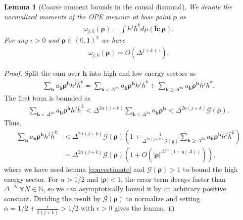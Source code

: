 \documentclass[a4paper,11pt]{article}
\theoremstyle{plain}
\newtheorem{lem}[thm]{Lemma}
\theoremstyle{definition}
\theoremstyle{remark}
\newcommand{\bs}[1]{\boldsymbol{#1}}
\newcommand{\bh}{{\bar{h}}}
\newcommand{\ba}{\begin{equation} \begin{aligned}}
\newcommand{\ea}{\end{aligned} \end{equation}}
\newcommand{\De}{\Delta}
\begin{document}
\begin{appendix}
\begin{lem}[Coarse moment bounds in the causal diamond]
We denote the normalized moments of the OPE measure at base point $\bs{\rho}$ as
\ba
\omega_{j,k}(\bs{\rho}) = \int h^j \bh^k d\mu(\bs{h};\bs{\rho}).
\ea
For any $\epsilon > 0$ and $\bs{\rho} \in (0,1)^2$ we have
\ba
\omega_{j,k}(\bs{\rho}) = O(\De^{j+k + \epsilon}).
\ea
\end{lem}
\begin{proof}
    Split the sum over $\bs{h}$ into high and low energy sectors as
    \ba
\sum_{\bs{h}} a_{\bs{h}}\bs{\rho}^{\bs{h}} h^j \bh^k = \sum_{\bs{h} < \De^{2\alpha} } a_{\bs{h}}  \bs{\rho}^{\bs{h}} h^j \bh^k +\sum_{\bs{h} \geq \De^{2\alpha}} a_{\bs{h}} \bs{\rho}^{\bs{h}} h^j \bh^k .
    \ea
    The first term is bounded as
    \ba
\sum_{\bs{h} < \De^{2\alpha} } a_{\bs{h}} \bs{\rho}^{\bs{h}} h^j \bh^k <  \De^{2\alpha(j+k)}\sum_{\bs{h} < \De^{2\alpha} } a_{\bs{h}} \bs{\rho}^{\bs{h}} 
< \De^{2\alpha(j+k)} \mathcal{G}(\bs{\rho}).
    \ea
    Thus,
    \ba
\sum_{\bs{h}} a_{\bs{h}}\bs{\rho}^{\bs{h}} h^j \bh^k &< \De^{2\alpha(j+k)} \mathcal{G}(\bs{\rho}) \left( 1 + \frac{1}{\De^{2\alpha(j+k)} \mathcal{G}(\bs{\rho})}\sum_{\bs{h} \geq \De^{2\alpha}} a_{\bs{h}} \bs{\rho}^{\bs{h}} h^j \bh^k  \right)\\
&= \De^{2\alpha(j+k)} \mathcal{G}(\bs{\rho}) \left( 1 + O\left( |\bs{\rho}|^{\De^{2\alpha} (1+g(\De))}\right) \right),
    \ea
    where we have used lemma \ref{convestimate} and $\mathcal{G}(\bs{\rho}) > 1$ to bound the high energy sector. For $\alpha > 1/2$ and $|\bs{\rho}|<1$, the error term decays faster than $\De^{-N} \; \forall N \in\mathbb{N}$, so we can asymptotically bound it by an arbitrary positive constant. Dividing the result by $\mathcal{G}(\bs{\rho})$ to normalize and setting $\alpha = 1/2 + \frac{\epsilon}{2(j+k)}>1/2$ with $\epsilon > 0$ gives the lemma.
\end{proof}


\end{appendix}
\end{document}
